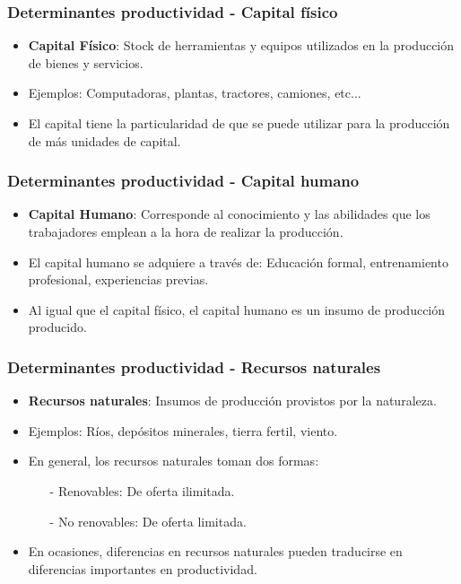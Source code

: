 \documentclass{beamer}
\begin{document}
\begin{frame}
\frametitle{Determinantes productividad - Capital f\'isico}
\begin{itemize}
\setlength\itemsep{1.5em}
\item \textbf{Capital F\'isico}: Stock de herramientas y equipos utilizados en la producci\'on de bienes y servicios.
\item Ejemplos: Computadoras, plantas, tractores, camiones, etc...
\item El capital tiene la particularidad de que se puede utilizar para la producci\'on de m\'as unidades de capital.
\end{itemize}
\end{frame}

\begin{frame}
\frametitle{Determinantes productividad - Capital humano}
\begin{itemize}
\setlength\itemsep{1.5em}
\item \textbf{Capital Humano}: Corresponde al conocimiento y las abilidades que los trabajadores emplean a la hora de realizar la producci\'on.
\item El capital humano se adquiere a trav\'es de: Educaci\'on formal, entrenamiento profesional, experiencias previas.
\item Al igual que el capital f\'isico, el capital humano es un insumo de producci\'on producido.
\end{itemize}
\end{frame}

\begin{frame}
\frametitle{Determinantes productividad - Recursos naturales}
\begin{itemize}
\setlength\itemsep{1.0em}
\item \textbf{Recursos naturales}: Insumos de producci\'on provistos por la naturaleza.
\item Ejemplos: R\'ios, dep\'ositos minerales, tierra fertil, viento.
\item En general, los recursos naturales toman dos formas:\\
\begin{itemize}
\setlength\itemsep{0.8em}
\item[-] Renovables: De oferta ilimitada.
\item[-] No renovables: De oferta limitada.
\end{itemize}
\item En ocasiones, diferencias en recursos naturales pueden traducirse en diferencias importantes en productividad.
\end{itemize}
\end{frame}
\end{document}

